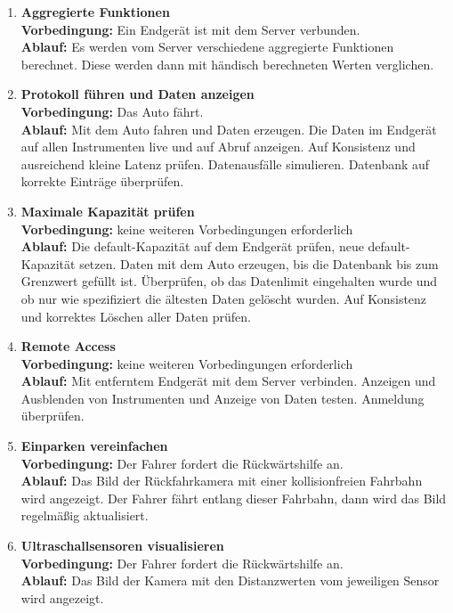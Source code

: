 \documentclass[pflichtenheft.tex]{subfiles}
\begin{document}
\begin{enumerate}
\item{\textbf{Aggregierte Funktionen}} \\
\textbf{Vorbedingung: } Ein Endgerät ist mit dem Server verbunden. \\ 
\textbf{Ablauf: } Es werden vom Server verschiedene aggregierte Funktionen berechnet. Diese werden dann mit händisch berechneten Werten verglichen.

\item{\textbf{Protokoll führen und Daten anzeigen}} \\
\textbf{Vorbedingung: } Das Auto fährt. \\
\textbf{Ablauf: } Mit dem Auto fahren und Daten erzeugen. Die Daten im Endgerät auf allen Instrumenten live und auf Abruf anzeigen. Auf Konsistenz und ausreichend kleine Latenz prüfen. Datenausfälle simulieren. Datenbank auf korrekte Einträge überprüfen.

\item{\textbf{Maximale Kapazität prüfen}} \\
\textbf{Vorbedingung: } keine weiteren Vorbedingungen erforderlich \\
\textbf{Ablauf: } Die default-Kapazität auf dem Endgerät prüfen, neue default-Kapazität setzen. Daten mit dem Auto erzeugen, bis die Datenbank bis zum Grenzwert gefüllt ist. Überprüfen, ob das Datenlimit eingehalten wurde und ob nur wie spezifiziert die ältesten Daten gelöscht wurden. Auf Konsistenz und korrektes Löschen aller Daten prüfen.

\item{\textbf{Remote Access}} \\
\textbf{Vorbedingung: } keine weiteren Vorbedingungen erforderlich \\
\textbf{Ablauf: } Mit entferntem Endgerät mit dem Server verbinden. Anzeigen und Ausblenden von Instrumenten und Anzeige von Daten testen. Anmeldung überprüfen.

\item{\textbf{Einparken vereinfachen}} \\
\textbf{Vorbedingung: } Der Fahrer fordert die Rückwärtshilfe an. \\
\textbf{Ablauf: } Das Bild der Rückfahrkamera mit einer kollisionfreien
Fahrbahn wird angezeigt. Der Fahrer fährt entlang dieser Fahrbahn, dann wird das
Bild regelmäßig aktualisiert.

\item{\textbf{Ultraschallsensoren visualisieren}} \\
\textbf{Vorbedingung: } Der Fahrer fordert die Rückwärtshilfe an. \\
\textbf{Ablauf: } Das Bild der Kamera mit den Distanzwerten vom jeweiligen
Sensor wird angezeigt.


\end{enumerate}
\end{document}
